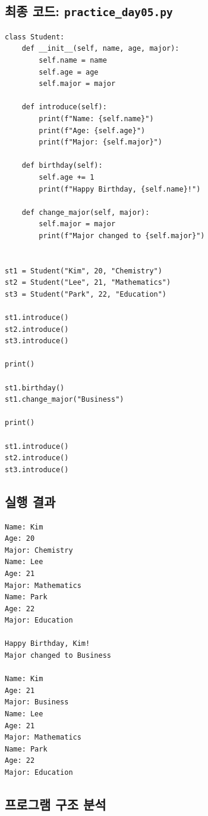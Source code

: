 \documentclass[11pt,a4paper]{article}
\begin{document}
\subsection{최종 코드: \texttt{practice\_day05.py}}

\begin{lstlisting}
class Student:
    def __init__(self, name, age, major):
        self.name = name
        self.age = age
        self.major = major

    def introduce(self):
        print(f"Name: {self.name}")
        print(f"Age: {self.age}")
        print(f"Major: {self.major}")

    def birthday(self):
        self.age += 1
        print(f"Happy Birthday, {self.name}!")

    def change_major(self, major):
        self.major = major
        print(f"Major changed to {self.major}")


st1 = Student("Kim", 20, "Chemistry")
st2 = Student("Lee", 21, "Mathematics")
st3 = Student("Park", 22, "Education")

st1.introduce()
st2.introduce()
st3.introduce()

print()

st1.birthday()
st1.change_major("Business")

print()

st1.introduce()
st2.introduce()
st3.introduce()
\end{lstlisting}

\subsection{실행 결과}

\begin{verbatim}
Name: Kim
Age: 20
Major: Chemistry
Name: Lee
Age: 21
Major: Mathematics
Name: Park
Age: 22
Major: Education

Happy Birthday, Kim!
Major changed to Business

Name: Kim
Age: 21
Major: Business
Name: Lee
Age: 21
Major: Mathematics
Name: Park
Age: 22
Major: Education
\end{verbatim}

\subsection{프로그램 구조 분석}
\end{document}

